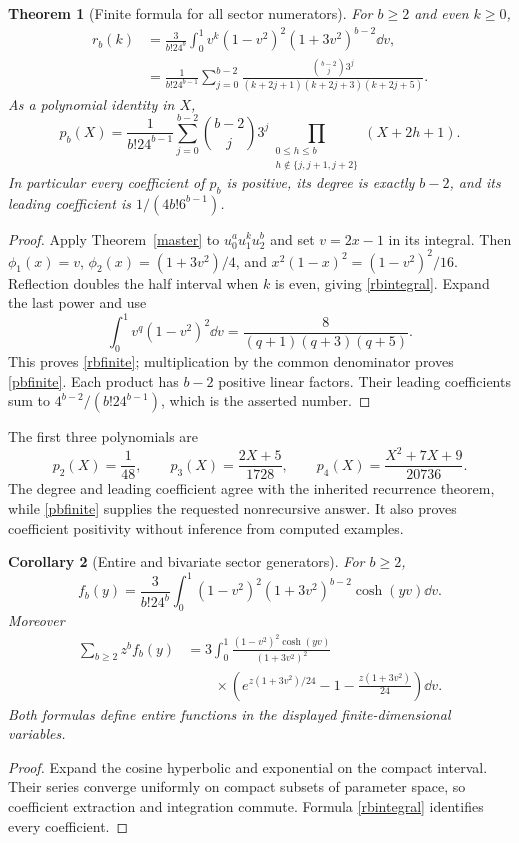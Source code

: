 \documentclass[11pt]{article}
\numberwithin{equation}{section}
\newtheorem{theorem}{Theorem}[section]
\newtheorem{corollary}[theorem]{Corollary}
\theoremstyle{definition}\newtheorem{definition}[theorem]{Definition}
\theoremstyle{remark}\newtheorem{remark}[theorem]{Remark}
\begin{document}
\begin{theorem}[Finite formula for all sector numerators]\label{pb}
For $b\ge2$ and even $k\ge0$,
\begin{align}
 r_b(k)&=\frac{3}{b!24^b}\int_0^1
       v^k(1-v^2)^2(1+3v^2)^{b-2}\dd v,\label{rbintegral}\\
 &=\frac1{b!24^{b-1}}\sum_{j=0}^{b-2}
 \frac{\binom{b-2}{j}3^j}{(k+2j+1)(k+2j+3)(k+2j+5)}.\label{rbfinite}
\end{align}
As a polynomial identity in $X$,
\begin{equation}\label{pbfinite}
\boxed{
 p_b(X)=\frac1{b!24^{b-1}}\sum_{j=0}^{b-2}\binom{b-2}{j}3^j
 \prod_{\substack{0\le h\le b\\h\notin\{j,j+1,j+2\}}}(X+2h+1).}
\end{equation}
In particular every coefficient of $p_b$ is positive, its degree is exactly $b-2$, and its leading coefficient is $1/(4b!6^{b-1})$.
\end{theorem}
\begin{proof}
Apply Theorem~\ref{master} to $u_0^a u_1^k u_2^b$ and set $v=2x-1$ in its integral. Then $\phi_1(x)=v$, $\phi_2(x)=(1+3v^2)/4$, and $x^2(1-x)^2=(1-v^2)^2/16$. Reflection doubles the half interval when $k$ is even, giving \eqref{rbintegral}. Expand the last power and use
\[
 \int_0^1 v^q(1-v^2)^2\dd v
 =\frac8{(q+1)(q+3)(q+5)}.
\]
This proves \eqref{rbfinite}; multiplication by the common denominator proves \eqref{pbfinite}. Each product has $b-2$ positive linear factors. Their leading coefficients sum to $4^{b-2}/(b!24^{b-1})$, which is the asserted number.
\end{proof}
The first three polynomials are
\[
 p_2(X)=\frac1{48},\qquad
 p_3(X)=\frac{2X+5}{1728},\qquad
 p_4(X)=\frac{X^2+7X+9}{20736}.
\]
The degree and leading coefficient agree with the inherited recurrence theorem, while \eqref{pbfinite} supplies the requested nonrecursive answer. It also proves coefficient positivity without inference from computed examples.

\begin{corollary}[Entire and bivariate sector generators]\label{bivariable}
For $b\ge2$,
\[
 f_b(y)=\frac3{b!24^b}\int_0^1(1-v^2)^2(1+3v^2)^{b-2}\cosh(yv)\dd v.
\]
Moreover
\begin{equation}\label{bivar}
\begin{split}
 \sum_{b\ge2}z^bf_b(y)&=3\int_0^1
 \frac{(1-v^2)^2\cosh(yv)}{(1+3v^2)^2}\\
 &\qquad\times\left(e^{z(1+3v^2)/24}-1-\frac{z(1+3v^2)}{24}\right)\dd v.
\end{split}
\end{equation}
Both formulas define entire functions in the displayed finite-dimensional variables.
\end{corollary}
\begin{proof}
Expand the cosine hyperbolic and exponential on the compact interval. Their series converge uniformly on compact subsets of parameter space, so coefficient extraction and integration commute. Formula \eqref{rbintegral} identifies every coefficient.
\end{proof}
\end{document}
